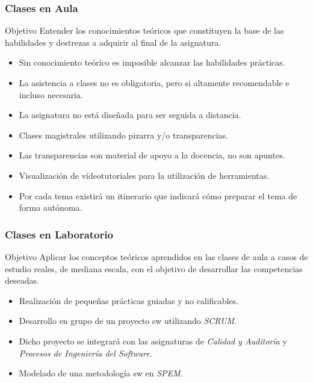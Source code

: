 \documentclass[animated,a4paper,slidestop,xcolor=pst,blue]{beamer}
\begin{document}
\begin{frame}
	\frametitle{Clases en Aula}
	\begin{block}{Objetivo}
        Entender los conocimientos teóricos que constituyen la base de las habilidades y destrezas a adquirir al final de la asignatura.
	\end{block}
	\begin{itemize}
		\item<2-> \alert{Sin conocimiento teórico es imposible alcanzar las habilidades prácticas}.
        \item<3-> La asistencia a clases no es obligatoria, \alert{pero si altamente recomendable e incluso necesaria}.
        \item<4-> La asignatura no está diseñada para ser seguida a distancia.		
        \item<5-> Clases magistrales utilizando pizarra y/o transparencias.
		\item<6-> \alert{Las transparencias} son material de apoyo a la docencia, \alert{no son apuntes}.
        \item<7-> Visualización de vídeotutoriales para la utilización de herramientas.
        \item<8-> Por cada tema existirá un itinerario que indicará cómo preparar el tema de forma autónoma.
	\end{itemize}
\end{frame}

\begin{frame}[c]
	\frametitle{Clases en Laboratorio}
	\begin{block}{Objetivo}
        Aplicar los conceptos teóricos aprendidos en las clases de aula a casos de estudio reales, de mediana escala, con el objetivo de desarrollar las competencias deseadas.
	\end{block}
	\begin{itemize}[<+->]
        \item Realización de pequeñas prácticas guiadas y no calificables.
        \item Desarrollo \alert{en grupo} de un proyecto sw utilizando \emph{SCRUM}.
        \item Dicho proyecto se integrará con las asignaturas de \emph{Calidad y Auditoría} y \emph{Procesos de Ingeniería del Software}.
        \item Modelado de una metodología sw en \emph{SPEM}.
	\end{itemize}
\end{frame}
\end{document}
